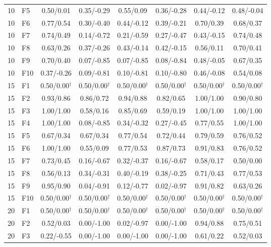 \documentclass[algorithms,article,submit,moreauthors,pdftex]{Definitions/mdpi}
\begin{document}
\begin{table}[p]
{\begin{tabular}{clcccccc}
10 & F5 & 0.50/0.01 & 0.35/-0.29 & 0.55/0.09 & 0.36/-0.28 & 0.44/-0.12 & 0.48/-0.04 \\
10 & F6 & 0.77/0.54 & 0.30/-0.40 & 0.44/-0.12 & 0.39/-0.21 & 0.70/0.39 & 0.68/0.37 \\
10 & F7 & 0.74/0.49 & 0.14/-0.72 & 0.21/-0.59 & 0.27/-0.47 & 0.43/-0.15 & 0.74/0.48 \\
10 & F8 & 0.63/0.26 & 0.37/-0.26 & 0.43/-0.14 & 0.42/-0.15 & 0.56/0.11 & 0.70/0.41 \\
10 & F9 & 0.70/0.40 & 0.07/-0.85 & 0.07/-0.85 & 0.08/-0.84 & 0.48/-0.05 & 0.67/0.35 \\
10 & F10 & 0.37/-0.26 & 0.09/-0.81 & 0.10/-0.81 & 0.10/-0.80 & 0.46/-0.08 & 0.54/0.08 \\
\midrule
15 & F1 & 0.50/0.00$^{\dagger}$ & 0.50/0.00$^{\dagger}$ & 0.50/0.00$^{\dagger}$ & 0.50/0.00$^{\dagger}$ & 0.50/0.00$^{\dagger}$ & 0.50/0.00$^{\dagger}$ \\
15 & F2 & 0.93/0.86 & 0.86/0.72 & 0.94/0.88 & 0.82/0.65 & 1.00/1.00 & 0.90/0.80 \\
15 & F3 & 1.00/1.00 & 0.58/0.16 & 0.85/0.69 & 0.59/0.19 & 1.00/1.00 & 1.00/1.00 \\
15 & F4 & 1.00/1.00 & 0.08/-0.85 & 0.34/-0.32 & 0.27/-0.45 & 0.77/0.55 & 1.00/1.00 \\
15 & F5 & 0.67/0.34 & 0.67/0.34 & 0.77/0.54 & 0.72/0.44 & 0.79/0.59 & 0.76/0.52 \\
15 & F6 & 1.00/1.00 & 0.55/0.09 & 0.77/0.53 & 0.87/0.73 & 0.91/0.83 & 0.76/0.52 \\
15 & F7 & 0.73/0.45 & 0.16/-0.67 & 0.32/-0.37 & 0.16/-0.67 & 0.58/0.17 & 0.50/0.00 \\
15 & F8 & 0.56/0.13 & 0.34/-0.31 & 0.40/-0.19 & 0.38/-0.25 & 0.71/0.43 & 0.77/0.53 \\
15 & F9 & 0.95/0.90 & 0.04/-0.91 & 0.12/-0.77 & 0.02/-0.97 & 0.91/0.82 & 0.63/0.26 \\
15 & F10 & 0.50/0.00$^{\dagger}$ & 0.50/0.00$^{\dagger}$ & 0.50/0.00$^{\dagger}$ & 0.50/0.00$^{\dagger}$ & 0.50/0.00$^{\dagger}$ & 0.50/0.00$^{\dagger}$ \\
\midrule
20 & F1 & 0.50/0.00$^{\dagger}$ & 0.50/0.00$^{\dagger}$ & 0.50/0.00$^{\dagger}$ & 0.50/0.00$^{\dagger}$ & 0.50/0.00$^{\dagger}$ & 0.50/0.00$^{\dagger}$ \\
20 & F2 & 0.52/0.03 & 0.00/-1.00 & 0.02/-0.97 & 0.00/-1.00 & 0.94/0.88 & 0.75/0.51 \\
20 & F3 & 0.22/-0.55 & 0.00/-1.00 & 0.00/-1.00 & 0.00/-1.00 & 0.61/0.22 & 0.52/0.03 \\

\end{tabular}}
\end{table}
\end{document}
